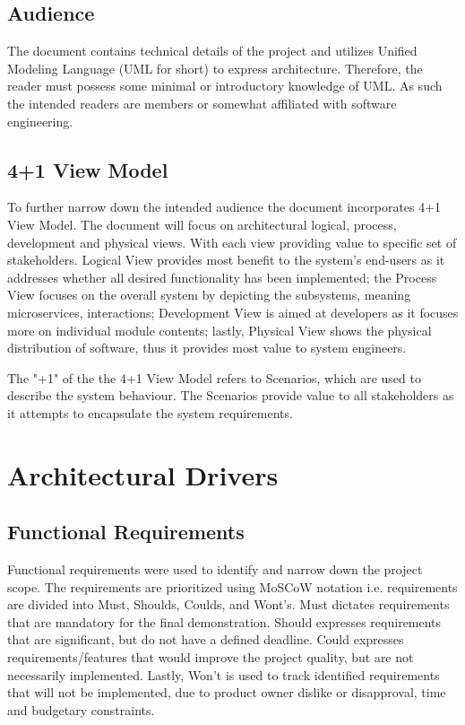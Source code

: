 \documentclass[12pt]{article}
\begin{document}
\subsection{Audience}
The document contains technical details of the project and utilizes Unified Modeling Language (UML for short) to express architecture. Therefore, the reader must possess some minimal or introductory knowledge of UML. As such the intended readers are members or somewhat affiliated with software engineering.
    
\subsection{4+1 View Model}
To further narrow down the intended audience the document incorporates 4+1 View Model. The document will focus on architectural logical, process, development and physical views. With each view providing value to specific set of stakeholders. Logical View provides most benefit to the system's end-users as it addresses whether all desired functionality has been implemented; the Process View focuses on the overall system by depicting the subsystems, meaning microservices, interactions; Development View is aimed at developers as it focuses more on individual module contents; lastly, Physical View shows the physical distribution of software, thus it provides most value to system engineers. \par
The "+1" of the the 4+1 View Model refers to Scenarios, which are used to describe the system behaviour. The Scenarios provide value to all stakeholders as it attempts to encapsulate the system requirements.\par

\pagebreak

\section{Architectural Drivers}
\subsection{Functional Requirements}
Functional requirements were used to identify and narrow down the project scope. The requirements are prioritized using MoSCoW notation i.e. requirements are divided into Must, Shoulds, Coulds, and Wont’s. Must dictates requirements that are mandatory for the final demonstration. Should expresses requirements that are significant, but do not have a defined deadline. Could expresses requirements/features that would improve the project quality, but are not necessarily implemented. Lastly, Won’t is used to track identified requirements that will not be implemented, due to product owner dislike or disapproval, time and budgetary constraints.\par
\end{document}
